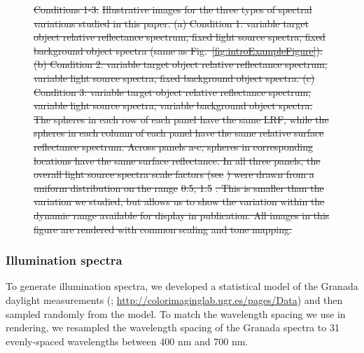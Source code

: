 \documentclass{jov}
\providecommand{\DIFdeltex}[1]{{\protect\color{red}\sout{#1}}}                      %
\providecommand{\DIFdelFL}[1]{\DIFdel{#1}} %
\providecommand{\DIFdelendFL}{} %
\providecommand{\DIFdel}[1]{\texorpdfstring{\DIFdeltex{#1}}{}} %
\DeclareRobustCommand{\DIFdelendFL}{\DIFOaddendFL \let\includegraphics\DIFOincludegraphics} %
\begin{document}
\begin{figure}
{%
\DIFdelFL{Conditions 1-3:}%
\DIFdelFL{Illustrative images for the three types of spectral variations studied in this paper. (a) Condition 1: variable target object relative reflectance spectrum, fixed light source spectra, fixed background object spectra (same as Fig.~\ref{fig:introExampleFigure}). 
(b) Condition 2: variable target object relative reflectance spectrum, variable light source spectra, fixed background object spectra. (c) Condition 3: variable target object relative reflectance spectrum, variable light source spectra, variable background object spectra. The spheres in each row of each panel have the same LRF, while the spheres in each column of each panel have the same relative surface reflectance spectrum.  Across panels a-c, spheres in corresponding locations have the same surface reflectance. In all three panels, the overall light source spectra scale factors (see }%
\DIFdelFL{) were drawn from a uniform distribution on the range }%
\DIFdelFL{0.5, 1.5}%
\DIFdelFL{. This is smaller than the variation we studied, but allows us to show the variation within the dynamic range available for display in publication. All images in this figure are rendered with common scaling and tone mapping.}} 
\DIFdelendFL \label{fig:studiedCases}
\end{figure}

\subsubsection{Illumination spectra}
To generate illumination spectra, we developed a statistical model of the Granada daylight measurements (; \href{http://colorimaginglab.ugr.es/pages/Data}{http://colorimaginglab.ugr.es/pages/Data}) and then sampled randomly from the model.
To match the wavelength spacing we use in rendering, we resampled the wavelength spacing of the Granada spectra to
31 evenly-spaced wavelengths between 400 nm and 700 nm.
\end{document}
